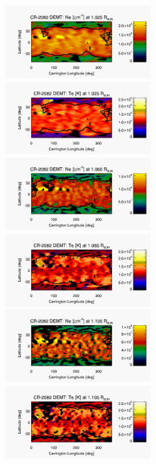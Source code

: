 \documentclass[namedreferences]{solarphysics}
\begin{document}
\begin{article}
\begin{figure}[h!]
\begin{center}
\includegraphics[width=0.495\textwidth]{figs/map_Ne_CR2082_DEMT-EUVI_behind_H1-L3523_r3d_1025_Rsun.pdf}
\includegraphics[width=0.495\textwidth]{figs/map_Tm_CR2082_DEMT-EUVI_behind_H1-L3523_r3d_1025_Rsun.pdf}
\includegraphics[width=0.495\textwidth]{figs/map_Ne_CR2082_DEMT-EUVI_behind_H1-L3523_r3d_1065_Rsun.pdf}
\includegraphics[width=0.495\textwidth]{figs/map_Tm_CR2082_DEMT-EUVI_behind_H1-L3523_r3d_1065_Rsun.pdf}
\includegraphics[width=0.495\textwidth]{figs/map_Ne_CR2082_DEMT-EUVI_behind_H1-L3523_r3d_1105_Rsun.pdf}
\includegraphics[width=0.495\textwidth]{figs/map_Tm_CR2082_DEMT-EUVI_behind_H1-L3523_r3d_1105_Rsun.pdf}

\end{center}
\end{figure}
\end{article}
\end{document}
